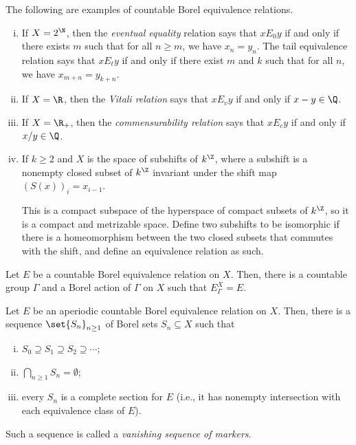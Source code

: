 \documentclass[10pt]{mypackage}
\begin{document}
\begin{example}
  The following are examples of countable Borel equivalence relations.
  \begin{enumerate}[(i)]
    \item If $X = 2^{\N}$, then the \textit{eventual equality} relation says that $xE_0 y$ if and only if there exists $m$ such that for all $n\geq m$, we have $x_n = y_n$. The tail equivalence relation says that $xE_t y$ if and only if there exist $m$ and $k$ such that for all $n$, we have $x_{m+n} = y_{k + n}$.
    \item If $X = \R$, then the \textit{Vitali relation} says that $xE_v y$ if and only if $x-y\in \Q$.
    \item If $X = \R_{+}$, then the \textit{commensurability relation} says that $xE_c y$ if and only if $x/y\in \Q$.
    \item If $k\geq 2$ and $X$ is the space of subshifts of $k^{\Z}$, where a subshift is a nonempty closed subset of $k^{\Z}$ invariant under the shift map $\left( S(x) \right)_{i} = x_{i-1}$.

      This is a compact subspace of the hyperspace of compact subsets of $k^{\Z}$, so it is a compact and metrizable space. Define two subshifts to be isomorphic if there is a homeomorphism between the two closed subsets that commutes with the shift, and define an equivalence relation as such.
  \end{enumerate}
\end{example}
\begin{theorem}
  Let $E$ be a countable Borel equivalence relation on $X$. Then, there is a countable group $\Gamma$ and a Borel action of $\Gamma$ on $X$ such that $E_{\Gamma}^X = E$. 
\end{theorem}
\begin{proposition}
  Let $E$ be an aperiodic countable Borel equivalence relation on $X$. Then, there is a sequence $\set{S_n}_{n\geq 1}$ of Borel sets $S_n\subseteq X$ such that
  \begin{enumerate}[(i)]
    \item $S_0\supseteq S_1\supseteq S_2\supseteq\cdots$;
    \item $\bigcap_{n\geq 1}S_n = \emptyset$;
    \item every $S_n$ is a complete section for $E$ (i.e., it has nonempty intersection with each equivalence class of $E$).
  \end{enumerate}
  Such a sequence is called a \textit{vanishing sequence of markers}.
\end{proposition}
\end{document}
